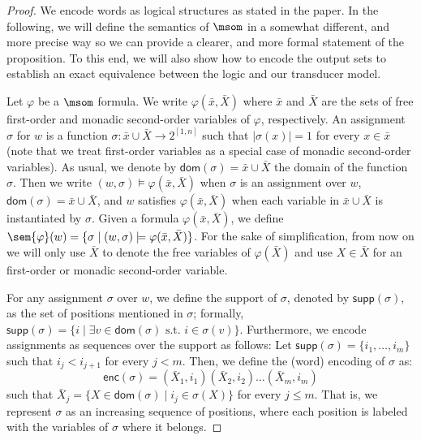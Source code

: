 \begin{proof}
	We encode words as logical structures as stated in the paper.
	In the following, we will define the semantics of $\msom$ in a somewhat different, and more precise way so we can provide a clearer, and more formal statement of the proposition. To this end, we will also show how to encode the output sets to establish an exact equivalence between the logic and our transducer model.
	
	Let $\varphi$ be a $\msom$ formula. 
	We write $\varphi(\bar{x}, \bar{X})$ where $\bar{x}$ and $\bar{X}$ are the sets of free first-order and monadic second-order variables of $\varphi$, respectively. 
	An assignment $\sigma$ for $w$ is a function $\sigma\colon \bar{x}\cup \bar{X}\to 2^{[1,n]}$ such that $|\sigma(x)| = 1$ for every $x \in \bar{x}$ (note that we treat first-order variables as a special case of monadic second-order variables). 
	As usual, we denote by $\textsf{dom}(\sigma) = \bar{x}\cup \bar{X}$ the domain of the function $\sigma$. 
	Then we write $(w, \sigma) \models \varphi(\bar{x}, \bar{X})$ when $\sigma$ is an assignment over $w$, $\textsf{dom}(\sigma) = \bar{x}\cup \bar{X}$, and $w$ satisfies $\varphi(\bar{x}, \bar{X})$ when each variable in $\bar{x}\cup \bar{X}$ is instantiated by $\sigma$. 
	Given a formula $\varphi(\bar{x},\bar{X})$, we define $\sem{\varphi}(w) = \{\sigma \mid (w, \sigma) \models \varphi(\bar{x},\bar{X})\}$. 
	For the sake of simplification, from now on we will only use $\bar{X}$ to denote the free variables of $\varphi(\bar{X})$ and use $X \in \bar{X}$ for an first-order or monadic second-order variable.
	
	For any assignment $\sigma$ over $w$, we define the support of $\sigma$, denoted by $\textsf{supp}(\sigma)$, as the set of positions mentioned in $\sigma$; formally, $\textsf{supp}(\sigma) = \{i \mid \exists v \in  \textsf{dom}(\sigma)\text{ s.t. } i \in  \sigma(v)\}$. 
	Furthermore, we encode assignments as sequences over the support as follows:
	Let $\textsf{supp}(\sigma) = \{i_1,\ldots, i_m\}$ such that $i_j < i_{j+1}$ for every $j < m$. 
	Then, we define the (word) encoding of $\sigma$ as:
	$$
	\textsf{enc}(\sigma) = (\bar{X}_1, i_1)(\bar{X}_2, i_2) \ldots (\bar{X}_m, i_m)
	$$
	such that $\bar{X}_j = \{X \in \textsf{dom}(\sigma) \mid i_j \in \sigma(X)\}$ for every $j \leq m$. 
	That is, we represent $\sigma$ as an increasing sequence of positions, where each position is labeled with the variables of $\sigma$ where it belongs.
	

\end{proof}
